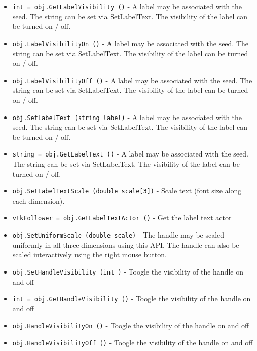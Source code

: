 \begin{itemize}
\item  \verb|int = obj.GetLabelVisibility ()| -  A label may be associated with the seed. The string can be set via
 SetLabelText. The visibility of the label can be turned on / off.

\item  \verb|obj.LabelVisibilityOn ()| -  A label may be associated with the seed. The string can be set via
 SetLabelText. The visibility of the label can be turned on / off.

\item  \verb|obj.LabelVisibilityOff ()| -  A label may be associated with the seed. The string can be set via
 SetLabelText. The visibility of the label can be turned on / off.

\item  \verb|obj.SetLabelText (string label)| -  A label may be associated with the seed. The string can be set via
 SetLabelText. The visibility of the label can be turned on / off.

\item  \verb|string = obj.GetLabelText ()| -  A label may be associated with the seed. The string can be set via
 SetLabelText. The visibility of the label can be turned on / off.

\item  \verb|obj.SetLabelTextScale (double scale[3])| -  Scale text (font size along each dimension).

\item  \verb|vtkFollower = obj.GetLabelTextActor ()| -  Get the label text actor

\item  \verb|obj.SetUniformScale (double scale)| -  The handle may be scaled uniformly in all three dimensions using this 
 API. The handle can also be scaled interactively using the right 
 mouse button.

\item  \verb|obj.SetHandleVisibility (int )| -  Toogle the visibility of the handle on and off

\item  \verb|int = obj.GetHandleVisibility ()| -  Toogle the visibility of the handle on and off

\item  \verb|obj.HandleVisibilityOn ()| -  Toogle the visibility of the handle on and off

\item  \verb|obj.HandleVisibilityOff ()| -  Toogle the visibility of the handle on and off

\end{itemize}
